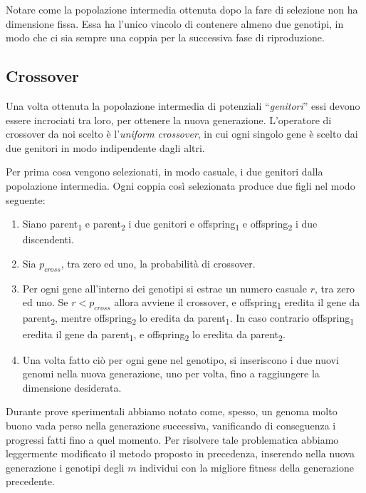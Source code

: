 \documentclass[a4paper,12pt]{article}
\begin{document}
Notare come la popolazione intermedia ottenuta dopo la fare di selezione non ha dimensione fissa. Essa ha l'unico vincolo di contenere almeno due genotipi, in modo che ci sia sempre una coppia per la successiva fase di riproduzione.
\subsection{Crossover} \label{crossover}
Una volta ottenuta la popolazione intermedia di potenziali ``\emph{genitori}'' essi devono essere incrociati tra loro, per ottenere la nuova generazione. L'operatore di crossover da noi scelto è l'\emph{uniform crossover}, in cui ogni singolo gene è scelto dai due genitori in modo indipendente dagli altri. 

Per prima cosa vengono selezionati, in modo casuale, i due genitori dalla popolazione intermedia. Ogni coppia così selezionata produce due figli nel modo seguente: 
\begin{enumerate}
	\item Siano parent\textsubscript{1} e parent\textsubscript{2} i due genitori e offspring\textsubscript{1} e offspring\textsubscript{2} i due discendenti.
	\item Sia $p_{cross}$, tra zero ed uno, la probabilità di crossover.
	\item Per ogni gene all'interno dei genotipi si estrae un numero casuale $r$, tra zero ed uno. Se $r < p_{cross}$ allora avviene il crossover, e offspring\textsubscript{1} eredita il gene da parent\textsubscript{2}, mentre offspring\textsubscript{2} lo eredita da parent\textsubscript{1}. In caso contrario offspring\textsubscript{1} eredita il gene da parent\textsubscript{1}, e offspring\textsubscript{2} lo eredita da parent\textsubscript{2}.
	\item Una volta fatto ciò per ogni gene nel genotipo, si inseriscono i due nuovi genomi nella nuova generazione, uno per volta, fino a raggiungere la dimensione desiderata. 
\end{enumerate}
Durante prove sperimentali abbiamo notato come, spesso, un genoma molto buono vada perso nella generazione successiva, vanificando di conseguenza i progressi fatti fino a quel momento. Per risolvere tale problematica abbiamo leggermente modificato il metodo proposto in precedenza, inserendo nella nuova generazione i genotipi degli $m$ individui con la migliore fitness della generazione precedente.
\end{document}
